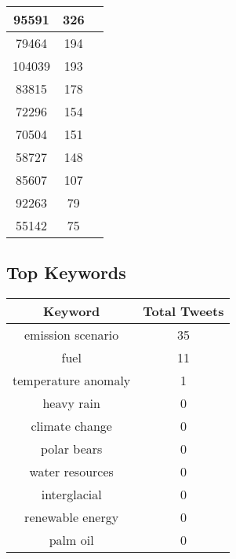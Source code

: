 \documentclass{article}\usepackage[T1]{fontenc}
\begin{document}
\begin{tabular}{|c|c|c|}
 \hline
95591 & 326\\ 
 \hline
79464 & 194\\ 
 \hline
104039 & 193\\ 
 \hline
83815 & 178\\ 
 \hline
72296 & 154\\ 
 \hline
70504 & 151\\ 
 \hline
58727 & 148\\ 
 \hline
85607 & 107\\ 
 \hline
92263 & 79\\ 
 \hline
55142 & 75\\ 
 \hline
\end{tabular}\subsection*{Top Keywords}\begin{tabular}{|c|c|}         \hline         Keyword & Total Tweets \\ 
 \hline
emission scenario & 35\\ 
 \hline
fuel & 11\\ 
 \hline
temperature anomaly & 1\\ 
 \hline
heavy rain & 0\\ 
 \hline
climate change & 0\\ 
 \hline
polar bears & 0\\ 
 \hline
water resources & 0\\ 
 \hline
interglacial & 0\\ 
 \hline
renewable energy & 0\\ 
 \hline
palm oil & 0\\ 
 \hline
\end{tabular}
\end{document}
